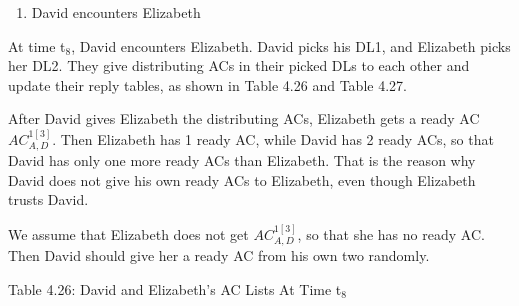 


\begin{enumerate}
\item  David encounters Elizabeth
\end{enumerate}

\noindent At time t${}_{8}$, David encounters Elizabeth. David picks his DL1, and Elizabeth picks her DL2. They give distributing ACs in their picked DLs to each other and update their reply tables, as shown in Table 4.26 and Table 4.27.

\noindent After David gives Elizabeth the distributing ACs, Elizabeth gets a ready AC ${AC}^{1\left[3\right]}_{A,D}$. Then Elizabeth has 1 ready AC, while David has 2 ready ACs, so that David has only one more ready ACs than Elizabeth. That is the reason why David does not give his own ready ACs to Elizabeth, even though Elizabeth trusts David. 

\noindent We assume that Elizabeth does not get ${AC}^{1\left[3\right]}_{A,D}$, so that she has no ready AC. Then David should give her a ready AC from his own two randomly.

Table 4.26: David and Elizabeth's AC Lists At Time t${}_{8}$

